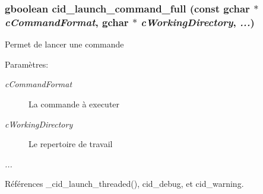 \subsubsection{\setlength{\rightskip}{0pt plus 5cm}gboolean cid\_\-launch\_\-command\_\-full (const gchar $\ast$ {\em cCommandFormat}, \/  gchar $\ast$ {\em cWorkingDirectory}, \/   {\em ...})}\label{cid-utilities_8c_793b10ad44f8331ad6dc0775e1bfe01c}


Permet de lancer une commande \begin{Desc}
\item[Paramètres:]
\begin{description}
\item[{\em cCommandFormat}]La commande à executer \item[{\em cWorkingDirectory}]Le repertoire de travail \item[{\em ...}]\end{description}
\end{Desc}


Références \_\-cid\_\-launch\_\-threaded(), cid\_\-debug, et cid\_\-warning.